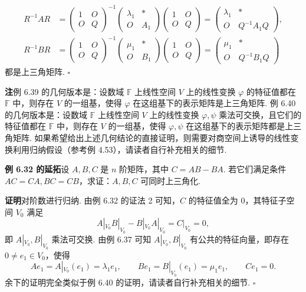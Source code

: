 \documentclass[UTF8, 12pt, fontset=fandol, oneside]{ctexart}
\begin{document}
\[
\begin{aligned}
R^{-1}AR
&=\left(\begin{array}{cc}
1 & O\\
O & Q
\end{array}\right)^{-1}
\left(\begin{array}{cc}
\lambda_1 & *\\
O & A_1
\end{array}\right)
\left(\begin{array}{cc}
1 & O\\
O & Q
\end{array}\right)
=\left(\begin{array}{cc}
\lambda_1 & *\\
O & Q^{-1}A_1Q
\end{array}\right),\\
R^{-1}BR
&=\left(\begin{array}{cc}
1 & O\\
O & Q
\end{array}\right)^{-1}
\left(\begin{array}{cc}
\mu_1 & *\\
O & B_1
\end{array}\right)
\left(\begin{array}{cc}
1 & O\\
O & Q
\end{array}\right)
=\left(\begin{array}{cc}
\mu_1 & *\\
O & Q^{-1}B_1Q
\end{array}\right)
\end{aligned}
\]
都是上三角矩阵. $\square$

\noindent\textbf{注}\quad 例 6.39 的几何版本是：设数域 $\mathbb{F}$ 上线性空间 $V$ 上的线性变换 $\varphi$ 的特征值都在 $\mathbb{F}$ 中，则存在 $V$ 的一组基，使得 $\varphi$ 在这组基下的表示矩阵是上三角矩阵. 例 6.40 的几何版本是：设数域 $\mathbb{F}$ 上线性空间 $V$ 上的线性变换 $\varphi,\psi$ 乘法可交换，且它们的特征值都在 $\mathbb{F}$ 中，则存在 $V$ 的一组基，使得 $\varphi,\psi$ 在这组基下的表示矩阵都是上三角矩阵. 如果希望给出上述几何结论的直接证明，则需要对商空间上诱导的线性变换利用归纳假设（参考例 4.53），请读者自行补充相关的细节.

\noindent\textbf{例 6.32 的延拓}\quad 设 $A,B,C$ 是 $n$ 阶矩阵，其中 $C=AB-BA$. 若它们满足条件 $AC=CA,BC=CB$，求证：$A,B,C$ 可同时上三角化.

\noindent\textbf{证明}\quad 对阶数进行归纳. 由例 6.32 的证法 2 可知，$C$ 的特征值全为 $0$，其特征子空间 $V_0$ 满足
\[
A|_{V_0}B|_{V_0}-B|_{V_0}A|_{V_0}=C|_{V_0}=0,
\]
即 $A|_{V_0},B|_{V_0}$ 乘法可交换. 由例 6.37 可知 $A|_{V_0},B|_{V_0}$ 有公共的特征向量，即存在 $0\ne e_1\in V_0$，使得
\[
Ae_1=A|_{V_0}(e_1)=\lambda_1e_1,\qquad
Be_1=B|_{V_0}(e_1)=\mu_1e_1,\qquad
Ce_1=0.
\]
余下的证明完全类似于例 6.40 的证明，请读者自行补充相关的细节. $\square$
\end{document}
